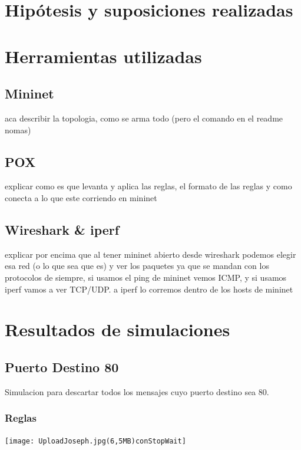 \documentclass{article}
\begin{document}
\section{\texorpdfstring{\textbf{Hipótesis y suposiciones realizadas}}{Hipótesis y suposiciones realizadas}}\label{hipuxf3tesis-y-suposiciones-realizadas-wip}


\section{\texorpdfstring{\textbf{Herramientas utilizadas}}{Herramientas utilizadas}}\label{implementaciuxf3n-wip}

\subsection{Mininet}\label{arquitectura-cliente-servidor}

aca describir la topologia, como se arma todo (pero el comando en el readme nomas)

\subsection{POX}\label{socketrdt}
explicar como es que levanta y aplica las reglas, el formato de las reglas
y como conecta a lo que este corriendo en mininet

\subsection{Wireshark \& iperf}\label{stop-and-wait}
explicar por encima que al tener mininet abierto
desde wireshark podemos elegir esa red (o lo que sea que es)
y ver los paquetes ya que se mandan con los protocolos de siempre,
si usamos el ping de mininet vemos ICMP, y si usamos iperf
vamos a ver TCP/UDP.
a iperf lo corremos dentro de los hosts de mininet

\section{\texorpdfstring{\textbf{Resultados de simulaciones}}{Resultados de simulaciones}}\label{pruebas-wip}

\subsection{Puerto Destino 80}
Simulacion para descartar todos los mensajes cuyo puerto destino sea 80.

\subsubsection{Reglas}
\begin{center}
\texttt{[image: UploadJoseph.jpg(6,5MB)conStopWait]}
\end{center}
\end{document}
